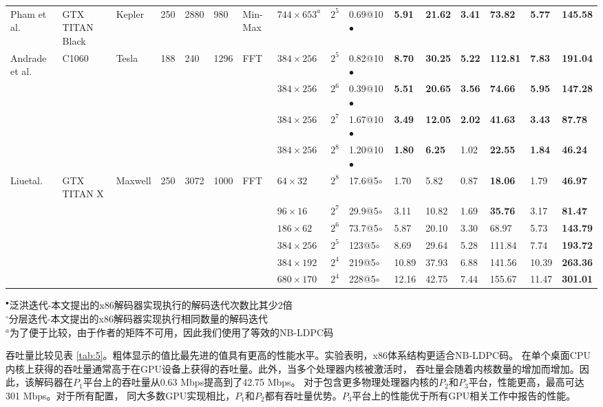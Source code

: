\documentclass{cjc}
\begin{document}
\begin{table}
\begin{tabular}{llllllllllllllll}
    Pham et al. \cite{noauthor_pham_nodate}&GTX TITAN Black&Kepler&250&2880&980&Min-Max&$744{\times}653^a$&$2^5$&0.69@10$\bullet$&\textbf{5.91}&\textbf{21.62}&\textbf{3.41}&\textbf{73.82}&\textbf{5.77}&\textbf{145.58}\\
    Andrade et al. \cite{noauthor_andrade_nodate}&C1060&Tesla&188&240&1296&FFT&$384{\times}256$&$2^5$&0.82@10$\bullet$&\textbf{8.70}&\textbf{30.25}&\textbf{5.22}&\textbf{112.81}&\textbf{7.83}&\textbf{191.04}\\
    &&&&&&&$384{\times}256$&$2^6$&0.39@10$\bullet$&\textbf{5.51}&\textbf{20.65}&\textbf{3.56}&\textbf{74.66}&\textbf{5.95}&\textbf{147.28}\\
    &&&&&&&$384{\times}256$&$2^7$&1.67@10$\bullet$&\textbf{3.49}&\textbf{12.05}&\textbf{2.02}&\textbf{41.63}&\textbf{3.43}&\textbf{87.78}\\
    &&&&&&&$384{\times}256$&$2^8$&1.20@10$\bullet$&\textbf{1.80}&\textbf{6.25}&1.02&\textbf{22.55}&\textbf{1.84}&\textbf{46.24}\\
    Liuetal.\cite{liu_high-throughput_2018}&GTX TITAN X&Maxwell&250&3072&1000&FFT&$64{\times}32$&$2^8$&17.6@5$\circ$&1.70&5.82&0.87&\textbf{18.06}&1.79&\textbf{46.97}\\
    &&&&&&&$96{\times}16$&$2^7$&29.9@5$\circ$&3.11&10.82&1.69&\textbf{35.76}&3.17&\textbf{81.47}\\
    &&&&&&&$186{\times}62$&$2^6$&73.7@5$\circ$&5.87&20.10&3.30&68.97&5.73&\textbf{143.79}\\
    &&&&&&&$384{\times}256$&$2^5$&123@5$\circ$&8.69&29.64&5.28&111.84&7.74&\textbf{193.72}\\
    &&&&&&&$384{\times}192$&$2^4$&219@5$\circ$&10.89&37.93&6.88&141.56&10.39&\textbf{263.36}\\
    &&&&&&&$680{\times}170$&$2^4$&228@5$\circ$&12.16&42.75&7.44&155.67&11.47&\textbf{301.01}\\
    \bottomrule
  \end{tabular}
  \medskip\newline
  \noindent
  $^\bullet$泛洪迭代-本文提出的x86解码器实现执行的解码迭代次数比其少2倍\\
  $^\circ$分层迭代-本文提出的x86解码器实现执行相同数量的解码迭代\\
  $^a$为了便于比较，由于作者的矩阵不可用，因此我们使用了等效的NB-LDPC码
\end{table}

  吞吐量比较见表 \ref{tab:5}。粗体显示的值比最先进的值具有更高的性能水平。实验表明，x86体系结构更适合NB-LDPC码。
  在单个桌面CPU内核上获得的吞吐量通常高于在GPU设备上获得的吞吐量。此外，当多个处理器内核被激活时，
  吞吐量会随着内核数量的增加而增加。因此，该解码器在$P_1$平台上的吞吐量从0.63 Mbps提高到了42.75 Mbps。
  对于包含更多物理处理器内核的$P_2$和$P_3$平台，性能更高，最高可达301 Mbps。对于所有配置，
  同大多数GPU实现相比，$P_1$和$P_2$都有吞吐量优势。$P_3$平台上的性能优于所有GPU相关工作中报告的性能。
\end{document}
